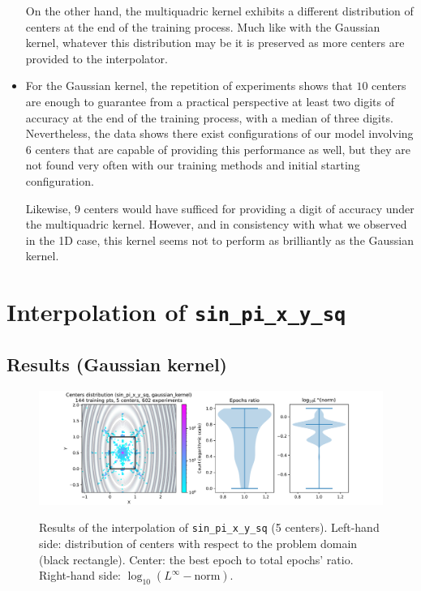 \documentclass[12pt]{report} %
\begin{document}
\begin{itemize}
        On the other hand, the multiquadric kernel exhibits a different distribution of
        centers at the end of the training process. Much like with the Gaussian kernel,
        whatever this distribution may be it is preserved as more centers are provided
        to the interpolator.

  \item For the Gaussian kernel, the repetition of experiments shows that
        $10$ centers are enough to guarantee
        from a practical perspective at least two digits of accuracy at the end of the
        training process, with a median of three digits. Nevertheless, the data shows
        there exist configurations of our model involving 6 centers that are capable of
        providing this performance as well, but they are not found very often with our
        training methods and initial starting configuration.

        Likewise, 9 centers would have sufficed for providing a digit of accuracy under
        the multiquadric kernel. However, and in consistency with what we observed in the
        1D case, this kernel seems not to perform as brilliantly as the Gaussian kernel.
\end{itemize}

\section{Interpolation of \texttt{sin\_pi\_x\_y\_sq}}\label{sec:interp2d-experiment2}

\subsection*{Results (Gaussian kernel)}

\begin{figure}[H]
  {\includegraphics[width=\textwidth, trim={2cm 0 2.8cm 0}, clip=true]{imagenes/experiments/2d/sin_pi_x_y_sq_interpolation/tr12_c5_sin_pi_x_y_sq_gaussian_kernel.pdf}}
  \caption{Results of the interpolation of \texttt{sin\_pi\_x\_y\_sq} (5 centers).
    Left-hand side: distribution of centers with respect to the problem domain (black rectangle). Center: the best epoch to total epochs' ratio.
    Right-hand side: $\log_{10}(L^\infty-\text{norm})$.}
  \label{fig:sin-pi-x-y-sq-tr12-c5}
\end{figure}
\end{document}
